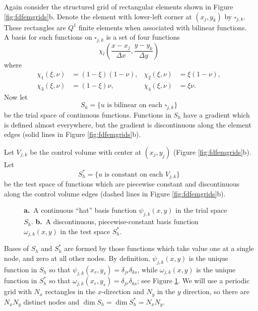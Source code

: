 \documentclass[twocolumn,letterpaper]{igs}
\begin{document}
Again consider the structured grid of rectangular elements shown in Figure \ref{fig:fdfemgrids}b.  Denote the element with lower-left corner at $(x_j,y_k)$ by $\square_{j,k}$.  These rectangles are $Q^1$ finite elements \citep{Elmanetal2005} when associated with bilinear functions.  A basis for such functions on $\square_{j,k}$ is a set of four functions
\begin{equation}
\chi_l\left(\frac{x-x_j}{\Delta x},\frac{y-y_k}{\Delta y}\right)  \label{eq:elementbasis}
\end{equation}
where
\begin{align*}
\chi_1(\xi,\nu) &= \left(1-\xi\right) \left(1-\nu\right), & \chi_2(\xi,\nu) &= \xi \left(1-\nu\right), \\
\chi_3(\xi,\nu) &= \left(1-\xi\right) \nu, & \chi_4(\xi,\nu) &= \xi \nu.
\end{align*}
Now let
\begin{equation}
S_h = \{u \text{ is bilinear on each $\square_{j,k}$}\}
\end{equation}
be the trial space of continuous functions.  Functions in $S_h$ have a gradient which is defined almost everywhere, but the gradient is discontinuous along the element edges (solid lines in Figure \ref{fig:fdfemgrids}b).

Let $V_{j,k}$ be the control volume with center at $(x_j,y_j)$ (Figure \ref{fig:fdfemgrids}b).  Let
\begin{equation}
S_h^* = \{u \text{ is constant on each $V_{j,k}$}\}
\end{equation}
be the test space of functions which are piecewise constant and discontinuous along the control volume edges (dashed lines in Figure \ref{fig:fdfemgrids}b).

\begin{figure}[ht]
\begin{center}
 \quad 
\end{center}
\caption{\textbf{a.}~A continuous ``hat'' basis function $\psi_{j,k}(x,y)$ in the trial space $S_h$.  \textbf{b.}~A discontinuous, piecewise-constant basis function $\omega_{j,k}(x,y)$ in the test space $S_h^*$.}
\label{fig:fembases}
\end{figure}

Bases of $S_h$ and $S_h^*$ are formed by those functions which take value one at a single node, and zero at all other nodes.  By definition, $\psi_{j,k}(x,y)$ is the unique function in $S_h$ so that $\psi_{j,k}(x_r,y_s) = \delta_{jr} \delta_{ks}$, while $\omega_{j,k}(x,y)$ is the unique function in $S_h^*$ so that $\omega_{j,k}(x_r,y_s) = \delta_{jr} \delta_{ks}$; see Figure \ref{fig:fembases}.  We will use a periodic grid with $N_x$ rectangles in the $x$-direction and $N_y$ in the $y$ direction, so there are $N_xN_y$ distinct nodes and $\dim S_h = \dim S_h^* = N_x N_y$.  
\end{document}
